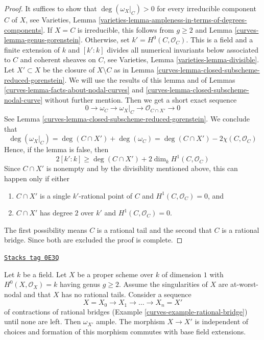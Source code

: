 \begin{proof}

It suffices to show that $\deg(\omega_X|_C) > 0$ for every irreducible
component $C$ of $X$, see Varieties, Lemma
\ref{varieties-lemma-ampleness-in-terms-of-degrees-components}.
If $X = C$ is irreducible, this follows from $g \geq 2$
and Lemma \ref{curves-lemma-genus-gorenstein}.
Otherwise, set $k' = H^0(C, \mathcal{O}_C)$. This
is a field and a finite extension of $k$ and $[k' : k]$
divides all numerical invariants below associated to $C$ and
coherent sheaves on $C$, see
Varieties, Lemma \ref{varieties-lemma-divisible}.
Let $X' \subset X$ be the closure of $X \setminus C$ as in
Lemma \ref{curves-lemma-closed-subscheme-reduced-gorenstein}.
We will use the results of this lemma and of
Lemmas \ref{curves-lemma-facts-about-nodal-curves} and
\ref{curves-lemma-closed-subscheme-nodal-curve} without further mention.
Then we get a short exact sequence
$$
0 \to \omega_C \to \omega_X|_C \to \mathcal{O}_{C \cap X'} \to 0
$$
See Lemma \ref{curves-lemma-closed-subscheme-reduced-gorenstein}.
We conclude that
$$
\deg(\omega_X|_C) = \deg(C \cap X') + \deg(\omega_C) =
\deg(C \cap X') - 2\chi(C, \mathcal{O}_C)
$$
Hence, if the lemma is false, then
$$
2[k' : k] \geq \deg(C \cap X') + 2\dim_k H^1(C, \mathcal{O}_C)
$$
Since $C \cap X'$ is nonempty and by the divisiblity mentioned above,
this can happen only if either
\begin{enumerate}
\item[(a)] $C \cap X'$ is a single $k'$-rational point of $C$ and
$H^1(C, \mathcal{O}_C) = 0$, and
\item[(b)] $C \cap X'$ has degree $2$ over $k'$ and
$H^1(C, \mathcal{O}_C) = 0$.
\end{enumerate}
The first possibility means $C$ is a rational tail
and the second that $C$ is a rational bridge.
Since both are excluded the proof is complete.
\end{proof}

\begin{lemma}
\label{curves-lemma-contracting-rational-bridges}
\href{https://stacks.math.columbia.edu/tag/0E3Q}{\texttt{Stacks tag 0E3Q}}

Let $k$ be a field. Let $X$ be a proper scheme over $k$ of dimension $1$
with $H^0(X, \mathcal{O}_X) = k$ having genus $g \geq 2$.
Assume the singularities of $X$ are at-worst-nodal and that
$X$ has no rational tails. Consider a sequence
$$
X = X_0 \to X_1 \to \ldots \to X_n = X'
$$
of contractions of rational bridges
(Example \ref{curves-example-rational-bridge}) until none are left.
Then $\omega_{X'}$ ample.
The morphism $X \to X'$ is independent of choices and
formation of this morphism commutes with base field extensions.
\end{lemma}

